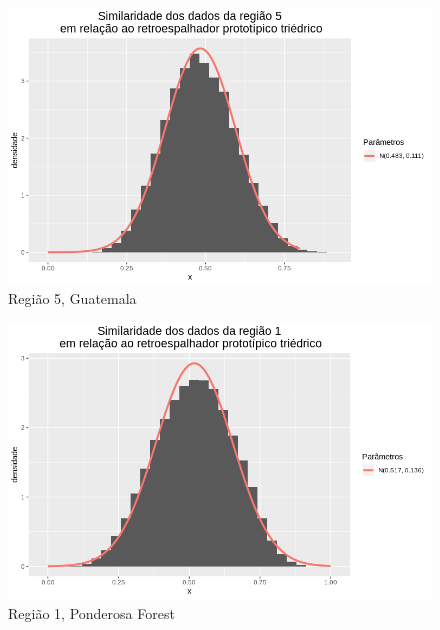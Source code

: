 \documentclass[12pt]{article}
\begin{document}
\begin{figure}[!h]
    \centering    
    \vspace{0.1\linewidth}
    \includegraphics[width = 0.95\linewidth]{../../Images/Report_18_12_17/tri_region5.png}
    \caption{Região 5, Guatemala}
    \label{fig:tri_r5}
\end{figure}

\begin{figure}[!h]
    \centering
    \vspace{0.1\linewidth}
    \includegraphics[width = \linewidth]{../../Images/Report_18_12_20/ponder_tri_region1.png}
    \caption{Região 1, Ponderosa Forest}
    \label{fig:pond_tri_r1}
\end{figure}
\end{document}
